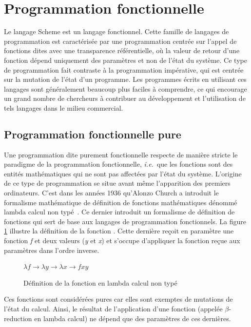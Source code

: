 \documentclass[12pt,twoside,letterpaper,francais]{book}
\newcommand{\ie}{{\textit{i.e.}~}}
\newcommand{\scheme}[1]{\selectlanguage{english}{\tt #1}\selectlanguage{french}}
\begin{document}
\FloatBarrier
\section{Programmation fonctionnelle}
Le langage Scheme est un langage fonctionnel. Cette famille de
langages de programmation est caractérisée par une programmation
centrée sur l'appel de fonctions dites avec une transparence
référentielle, où la valeur de retour d'une fonction dépend uniquement
des paramètres et non de l'état du système. Ce type de programmation
fait contraste à la programmation impérative, qui est centrée sur la
mutation de l'état d'un programme. Les programmes écrits en utilisant
ces langages sont généralement beaucoup plus faciles à comprendre, ce
qui encourage un grand nombre de chercheurs à contribuer au
dévelop\-pement et l'utilisation de tels langages dans le milieu
commercial.


\FloatBarrier
\subsection{Programmation fonctionnelle pure}
Une programmation dite purement fonctionnelle respecte de manière
stricte le paradigme de la programmation fonctionnelle, \ie que les
fonctions sont des entités mathématiques qui ne sont pas affectées par
l'état du système. L'origine de ce type de programmation se situe
avant même l'apparition des premiers ordinateurs. C'est dans les
années 1936 qu'Alonzo Church a introduit le formalisme mathématique de
définition de fonctions mathématiques dénommé lambda calcul non
typé~\cite{LAMBDA_CALCULUS}. Ce dernier introduit un formalisme de
définition de fonctions qui sert de base aux langages de programmation
fonctionnels. La figure \ref{FIG:lambda-calcul} illustre la définition
de la fonction \scheme{flip}. Cette dernière reçoit en paramètre une
fonction \textit{f} et deux valeurs (\textit{y} et \textit{x}) et
s'occupe d'appliquer la fonction reçue aux paramètres dans l'ordre
inverse.\\

\begin{figure}[htb!]
  \center
  $\lambda f \rightarrow \lambda y \rightarrow \lambda x \rightarrow f x y$
  \caption{Définition de la fonction \scheme{flip} en lambda calcul
    non typé}
  \label{FIG:lambda-calcul}
\end{figure}

Ces fonctions sont considérées pures car elles sont exemptes de
mutations de l'état du calcul. Ainsi, le résultat de l'application
d'une fonction (appelée $\beta$-reduction en lambda calcul) ne dépend
que des paramètres de ces dernières.
\end{document}
